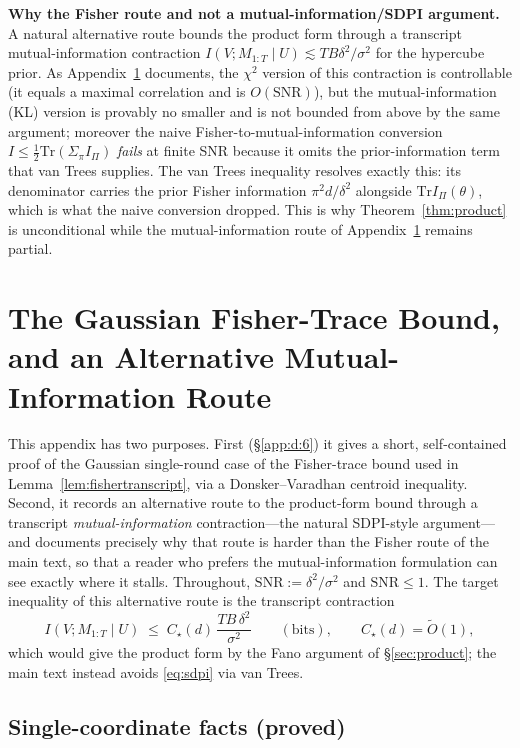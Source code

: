 \documentclass[11pt]{article}
\theoremstyle{definition}
\newcommand{\Tr}{\mathrm{Tr}}
\begin{document}
\noindent\textbf{Why the Fisher route and not a mutual-information/SDPI argument.} A natural alternative route
bounds the product form through a transcript mutual-information contraction
$I(V;M_{1:T}\mid U)\lesssim TB\delta^2/\sigma^2$ for the hypercube prior. As Appendix~\ref{app:partial}
documents, the $\chi^2$ version of this contraction is controllable (it equals a maximal correlation and
is $O(\mathrm{SNR})$), but the mutual-information (KL) version is provably no smaller and is not bounded from above by the same
argument; moreover the naive Fisher-to-mutual-information conversion
$I\le\tfrac12\Tr(\Sigma_\pi I_\Pi)$ \emph{fails} at finite SNR because it omits the prior-information term
that van Trees supplies. The van Trees inequality resolves exactly this: its denominator carries the
prior Fisher information $\pi^2 d/\delta^2$ alongside $\Tr I_\Pi(\theta)$, which is what the naive
conversion dropped. This is why Theorem~\ref{thm:product} is unconditional while the
mutual-information route of Appendix~\ref{app:partial} remains partial.


\section{The Gaussian Fisher-Trace Bound, and an Alternative Mutual-Information Route}
\label{app:partial}

This appendix has two purposes. First (\S\ref{app:d:6}) it gives a short, self-contained proof of the Gaussian
single-round case of the Fisher-trace bound used in Lemma~\ref{lem:fishertranscript}, via a
Donsker--Varadhan centroid inequality. Second, it records an alternative route to the product-form bound
through a transcript \emph{mutual-information} contraction---the natural SDPI-style argument---and
documents precisely why that route is harder than the Fisher route of the main text, so that a reader
who prefers the mutual-information formulation can see exactly where it stalls. Throughout,
$\mathrm{SNR}:=\delta^2/\sigma^2$ and $\mathrm{SNR}\le1$. The target inequality of this alternative route
is the transcript contraction
\begin{equation}
  I(V;M_{1:T}\mid U)\;\le\;C_\star(d)\,\frac{TB\,\delta^2}{\sigma^2}\qquad(\text{bits}),\qquad C_\star(d)=\widetilde O(1),
  \tag{$\star$}\label{eq:sdpi}
\end{equation}
which would give the product form by the Fano argument of \S\ref{sec:product}; the main text instead
avoids \eqref{eq:sdpi} via van Trees.

\subsection{Single-coordinate facts (proved)}\label{app:d:1}
\end{document}

